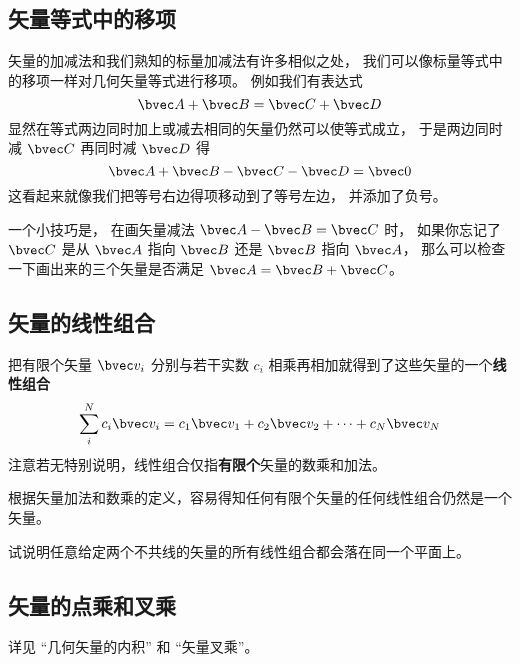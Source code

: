 \subsection{矢量等式中的移项}
矢量的加减法和我们熟知的标量加减法有许多相似之处， 我们可以像标量等式中的移项一样对几何矢量等式进行移项。 例如我们有表达式
\begin{equation}
\bvec A + \bvec B = \bvec C + \bvec D
\end{equation}
显然在等式两边同时加上或减去相同的矢量仍然可以使等式成立， 于是两边同时减 $\bvec C$ 再同时减 $\bvec D$ 得
\begin{equation}
\bvec A + \bvec B - \bvec C - \bvec D = \bvec 0
\end{equation}
这看起来就像我们把等号右边得项移动到了等号左边， 并添加了负号。

一个小技巧是， 在画矢量减法 $\bvec A - \bvec B = \bvec C$ 时， 如果你忘记了 $\bvec C$ 是从 $\bvec A$ 指向 $\bvec B$ 还是 $\bvec B$ 指向 $\bvec A$， 那么可以检查一下画出来的三个矢量是否满足 $\bvec A = \bvec B + \bvec C$。


\subsection{矢量的线性组合}
把有限个矢量 $\bvec v_i$ 分别与若干实数 $c_i$ 相乘再相加就得到了这些矢量的一个\textbf{线性组合}
\begin{equation}\label{eq_GVecOp_1}
\sum_i^N c_i \bvec v_i = c_1\bvec v_1 + c_2\bvec v_2 +\dots +c_N \bvec v_N
\end{equation}
注意若无特别说明，线性组合仅指\textbf{有限个}矢量的数乘和加法。

根据矢量加法和数乘的定义，容易得知任何有限个矢量的任何线性组合仍然是一个矢量。

\begin{exercise}{}
试说明任意给定两个不共线的矢量的所有线性组合都会落在同一个平面上。
\end{exercise}

\subsection{矢量的点乘和叉乘}
详见 “几何矢量的内积” 和 “矢量叉乘”。
